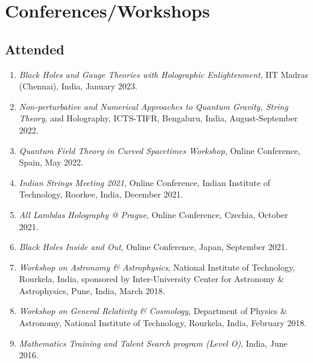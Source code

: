 \documentclass[11pt, letterpaper]{article}
\begin{document}
	\section{Conferences/Workshops}
	\subsection{Attended}
	\begin{enumerate}
		\item \textit{Black Holes and Gauge Theories with Holographic Enlightenment}, IIT Madras (Chennai), India, January 2023.
		
		\item \textit{Non-perturbative and Numerical Approaches to Quantum Gravity, String Theory}, and Holography, ICTS-TIFR, Bengaluru, India, August-September 2022.

		\item \textit{Quantum Field Theory in Curved Spacetimes Workshop}, Online Conference, Spain, May 2022.

		\item \textit{Indian Strings Meeting 2021}, Online Conference, Indian Institute of Technology, Roorkee, India, December 2021.

		\item \textit{All Lambdas Holography @ Prague}, Online Conference, Czechia, October 2021.

		\item \textit{Black Holes Inside and Out}, Online Conference, Japan, September 2021.

		\item\textit{Workshop on Astronomy \& Astrophysics}, National Institute of Technology, Rourkela, India, sponsored by Inter-University Center for Astronomy \& Astrophysics, Pune, India, March 2018.

		\item \textit{Workshop on General Relativity \& Cosmology}, Department of Physics \& Astronomy, National Institute of Technology, Rourkela, India, February 2018.

		\item \textit{Mathematics Training and Talent Search program (Level O)}, India, June 2016.
	\end{enumerate}
\end{document}
